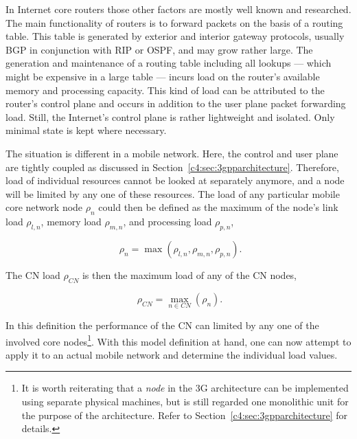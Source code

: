 In Internet core routers those other factors are mostly well known and researched. 
The main functionality of routers is to forward packets on the basis of a routing table. This table is generated by exterior and interior gateway protocols, usually \gls{BGP} in conjunction with \gls{RIP} or \gls{OSPF}, and may grow rather large. 
The generation and maintenance of a routing table including all lookups --- which might be expensive in a large table --- incurs load on the router's available memory and processing capacity. This kind of load can be attributed to the router's control plane and occurs in addition to the user plane packet forwarding load. Still, the Internet's control plane is rather lightweight and isolated. Only minimal state is kept where necessary.

The situation is different in a mobile network. Here, the control and user plane are tightly coupled as discussed in Section~\ref{c4:sec:3gpparchitecture}.  Therefore, load of individual resources cannot be looked at separately anymore, and a node will be limited by any one of these resources. The load of any particular mobile core network node $\rho_{n}$ 
could then be defined as the maximum of the node's link load $\rho_{l,n}$, memory load $\rho_{m,n}$, and processing load $\rho_{p,n}$,

\begin{equation}
	\phantom{,}\rho_{n} = \max(\rho_{l,n}, \rho_{m,n}, \rho_{p,n})\text{.}
\end{equation}

The \gls{CN} load $\rho_{CN}$ is then the maximum load of any of the \gls{CN} nodes,

\begin{equation}
	\phantom{.}\rho_{CN} = \max_{n \in CN}(\rho_{n})\text{.}
\end{equation}

In this definition the performance of the \gls{CN} can limited by any one of the involved core nodes\footnote{It is worth reiterating that a \textit{node} in the \gls{3G} architecture can be implemented using separate physical machines, but is still regarded one monolithic unit for the purpose of the architecture. Refer to Section~\ref{c4:sec:3gpparchitecture} for details.}. With this model definition at hand, one can now attempt to apply it to an actual mobile network and determine the individual load values. 


